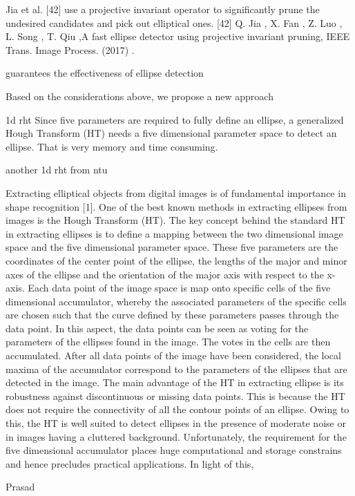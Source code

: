 \documentclass[a4paper]{report}
\begin{document}
Jia et al. [42] use a projective invariant operator to significantly prune the undesired candidates and pick out elliptical ones. 
[42] Q. Jia , X. Fan , Z. Luo , L. Song , T. Qiu ,A fast ellipse detector using projective invariant pruning, IEEE Trans. Image Process. (2017) .

guarantees the effectiveness of ellipse detection

Based on the considerations above, we propose a new approach




1d rht
Since five parameters are required to fully define an
ellipse, a generalized Hough Transform (HT) needs a five
dimensional parameter space to detect an ellipse. That is very
memory and time consuming.

another 1d rht from ntu

Extracting elliptical objects from digital images is of fundamental
importance in shape recognition [1]. One of the best known methods
in extracting ellipses from images is the Hough Transform (HT).
The key concept behind the standard HT in extracting ellipses is to
define a mapping between the two dimensional image space and the
five dimensional parameter space. These five parameters are the coordinates
of the center point of the ellipse, the lengths of the major
and minor axes of the ellipse and the orientation of the major axis
with respect to the x-axis. Each data point of the image space is map
onto specific cells of the five dimensional accumulator, whereby the
associated parameters of the specific cells are chosen such that the
curve defined by these parameters passes through the data point. In
this aspect, the data points can be seen as voting for the parameters
of the ellipses found in the image. The votes in the cells are then accumulated.
After all data points of the image have been considered,
the local maxima of the accumulator correspond to the parameters
of the ellipses that are detected in the image.
The main advantage of the HT in extracting ellipse is its robustness
against discontinuous or missing data points. This is because
the HT does not require the connectivity of all the contour points
of an ellipse. Owing to this, the HT is well suited to detect ellipses
in the presence of moderate noise or in images having a cluttered
background. Unfortunately, the requirement for the five dimensional
accumulator places huge computational and storage constrains and
hence precludes practical applications. In light of this,

Prasad
\end{document}

